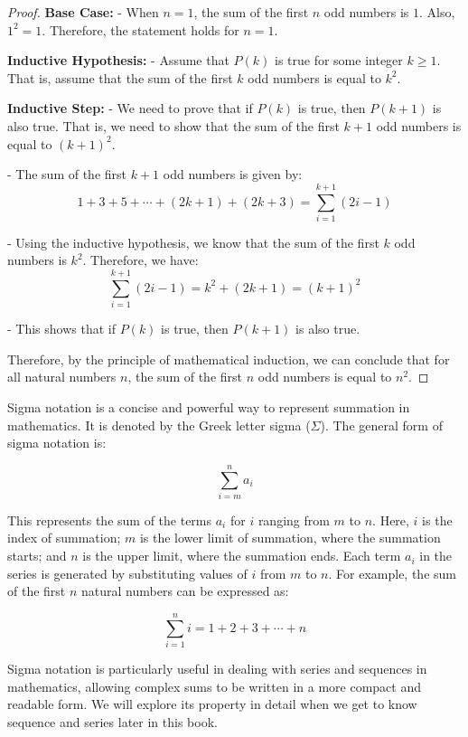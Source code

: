 \documentclass[
	12pt, %
	fleqn, %
	a4paper, %
]{LegrandOrangeBook}
\begin{document}
\begin{proof}
\textbf{Base Case:}
   - When $n=1$, the sum of the first $n$ odd numbers is $1$. Also, $1^2=1$. Therefore, the statement holds for $n=1$.

\textbf{Inductive Hypothesis:}
   - Assume that $P(k)$ is true for some integer $k\ge 1$. That is, assume that the sum of the first $k$ odd numbers is equal to $k^2$.

\textbf{Inductive Step:}
   - We need to prove that if $P(k)$ is true, then $P(k+1)$ is also true. That is, we need to show that the sum of the first $k+1$ odd numbers is equal to $(k+1)^2$.

   - The sum of the first $k+1$ odd numbers is given by:
     $$1 + 3 + 5 + \cdots + (2k+1) + (2k+3) = \sum_{i=1}^{k+1} (2i-1)$$
     
   - Using the inductive hypothesis, we know that the sum of the first $k$ odd numbers is $k^2$. Therefore, we have:
     $$\sum_{i=1}^{k+1} (2i-1) = k^2 + (2k+1) = (k+1)^2$$
     
   - This shows that if $P(k)$ is true, then $P(k+1)$ is also true.

Therefore, by the principle of mathematical induction, we can conclude that for all natural numbers $n$, the sum of the first $n$ odd numbers is equal to $n^2$.
\end{proof}
\begin{remark}
    Sigma notation is a concise and powerful way to represent summation in mathematics. It is denoted by the Greek letter sigma (\(\Sigma\)). The general form of sigma notation is:

\[\sum_{i=m}^{n} a_i\]

This represents the sum of the terms \(a_i\) for \(i\) ranging from \(m\) to \(n\). Here, \(i\) is the index of summation; \(m\) is the lower limit of summation, where the summation starts; and \(n\) is the upper limit, where the summation ends. Each term \(a_i\) in the series is generated by substituting values of \(i\) from \(m\) to \(n\). For example, the sum of the first \(n\) natural numbers can be expressed as:

\[\sum_{i=1}^{n} i = 1 + 2 + 3 + \cdots + n\]

Sigma notation is particularly useful in dealing with series and sequences in mathematics, allowing complex sums to be written in a more compact and readable form. We will explore its property in detail when we get to know sequence and series later in this book.
\end{remark}
\end{document}
